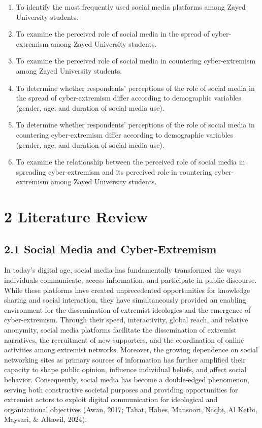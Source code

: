 \documentclass[10pt]{NSP1}
\begin{document}
	{\renewcommand{\labelenumi}{\alph{enumi}.}%
		\begin{enumerate}
			\item To identify the most frequently used social media platforms among Zayed University students.
			\item To examine the perceived role of social media in the spread of cyber-extremism among Zayed University students.
			\item To examine the perceived role of social media in countering cyber-extremism among Zayed University students.
			\item To determine whether respondents' perceptions of the role of social media in the spread of cyber-extremism differ according to demographic variables (gender, age, and duration of social media use).
			\item To determine whether respondents' perceptions of the role of social media in countering cyber-extremism differ according to demographic variables (gender, age, and duration of social media use).
			\item To examine the relationship between the perceived role of social media in spreading cyber-extremism and its perceived role in countering cyber-extremism among Zayed University students.
	\end{enumerate}}
	
	\section*{2 Literature Review}
	
	\subsection*{2.1 Social Media and Cyber-Extremism}
	
	In today's digital age, social media has fundamentally transformed the ways individuals communicate, access information, and participate in public discourse. While these platforms have created unprecedented opportunities for knowledge sharing and social interaction, they have simultaneously provided an enabling environment for the dissemination of extremist ideologies and the emergence of cyber-extremism. Through their speed, interactivity, global reach, and relative anonymity, social media platforms facilitate the dissemination of extremist narratives, the recruitment of new supporters, and the coordination of online activities among extremist networks. Moreover, the growing dependence on social networking sites as primary sources of information has further amplified their capacity to shape public opinion, influence individual beliefs, and affect social behavior. Consequently, social media has become a double-edged phenomenon, serving both constructive societal purposes and providing opportunities for extremist actors to exploit digital communication for ideological and organizational objectives (Awan, 2017; Tahat, Habes, Mansoori, Naqbi, Al Ketbi, Maysari, \& Altawil, 2024).
	
\end{document}
